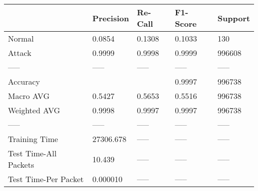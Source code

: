 \begin{tabular}{lllll}
\toprule
{} &  Precision & Re-Call & F1-Score & Support \\
\midrule
Normal                &     0.0854 &  0.1308 &   0.1033 &     130 \\
Attack                &     0.9999 &  0.9998 &   0.9999 &  996608 \\
-----                 &      ----- &   ----- &    ----- &   ----- \\
Accuracy              &            &         &   0.9997 &  996738 \\
Macro AVG             &     0.5427 &  0.5653 &   0.5516 &  996738 \\
Weighted AVG          &     0.9998 &  0.9997 &   0.9997 &  996738 \\
-----                 &      ----- &   ----- &    ----- &   ----- \\
Training Time         &  27306.678 &   ----- &    ----- &   ----- \\
Test Time-All Packets &     10.439 &   ----- &    ----- &   ----- \\
Test Time-Per Packet  &   0.000010 &   ----- &    ----- &   ----- \\
\bottomrule
\end{tabular}
